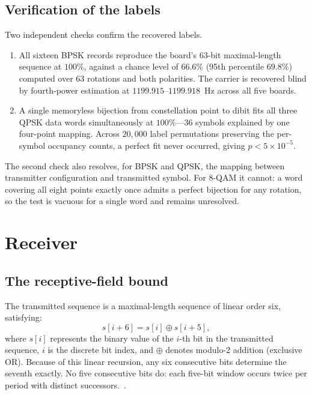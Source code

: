 \documentclass[journal]{IEEEtran}   %
\begin{document}
\subsection{Verification of the labels}
Two independent checks confirm the recovered labels.

\begin{enumerate}
\item All sixteen BPSK records reproduce the board's 63-bit maximal-length
sequence at $100\%$, against a chance level of $66.6\%$ (95th percentile
$69.8\%$) computed over 63 rotations and both polarities. The carrier is
recovered blind by fourth-power estimation at $1199.915$--$1199.918$~Hz across
all five boards.
\item A single memoryless bijection from constellation point to dibit fits all
three QPSK data words simultaneously at $100\%$---36 symbols explained by one
four-point mapping. Across $20{,}000$ label permutations preserving the
per-symbol occupancy counts, a perfect fit never occurred, giving
$p < 5\times10^{-5}$.
\end{enumerate}

The second check also resolves, for BPSK and QPSK, the mapping between
transmitter configuration and transmitted symbol. For 8-QAM it cannot: a word
covering all eight points exactly once admits a perfect bijection for any
rotation, so the test is vacuous for a single word and remains unresolved.

\section{Receiver}

\subsection{The receptive-field bound}
\label{sec:bound}
The transmitted sequence is a maximal-length sequence of linear order six, satisfying:
\begin{equation}
s[i+6] = s[i] \oplus s[i+5],
\label{eq:lfsr}
\end{equation}
where $s[i]$ represents the binary value of the $i$-th bit in the transmitted sequence, $i$ is the discrete bit index, and $\oplus$ denotes modulo-2 addition (exclusive OR). Because of this linear recursion, any six consecutive bits determine the seventh exactly. No five consecutive bits do: each five-bit window occurs twice per period with distinct successors.~\cite{golomb1982shift}.
\end{document}
